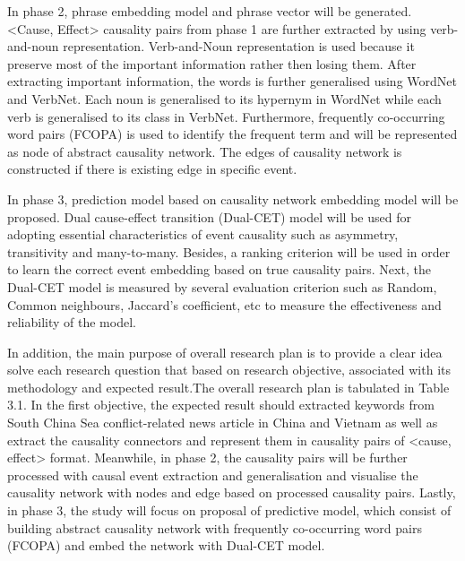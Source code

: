 \documentclass[twoside]{utmthesis}
\begin{document}
In phase 2, phrase embedding model and phrase vector will be generated. 
<Cause, Effect> causality pairs from phase 1 are further extracted by using verb-and-noun representation. Verb-and-Noun representation is used because it preserve most of the important information rather then losing them. After extracting important information, the words is further generalised using WordNet and VerbNet. Each noun is generalised to its hypernym in WordNet while each verb is generalised to its class in VerbNet. Furthermore, frequently co-occurring word pairs (FCOPA) is used to identify the frequent term and will be represented as node of abstract causality network. The edges of causality network is constructed if there is existing edge in specific event. 

In phase 3, prediction model based on causality network embedding model will be proposed. Dual cause-effect transition (Dual-CET) model will be used for adopting essential characteristics of event causality such as asymmetry, transitivity and many-to-many. Besides, a ranking criterion will be used in order to learn the correct event embedding based on true causality pairs. Next, the Dual-CET model is measured by several evaluation criterion such as Random, Common neighbours, Jaccard's coefficient, etc to measure the effectiveness and reliability of the model.  
  
In addition, the main purpose of overall research plan is to provide a clear idea solve each research question that based on research objective, associated with its methodology and expected result.The overall research plan is tabulated in Table 3.1. In the first objective, the expected result should extracted keywords from South China Sea conflict-related news article in China and Vietnam as well as extract the causality connectors and represent them in causality pairs of <cause, effect> format. Meanwhile, in phase 2, the causality pairs will be further processed with causal event extraction and generalisation and visualise the causality network with nodes and edge based on processed causality pairs. Lastly, in phase 3, the study will focus on proposal of predictive model, which consist of building abstract causality network with frequently co-occurring word pairs (FCOPA) and embed the network with Dual-CET model. 
\end{document}
